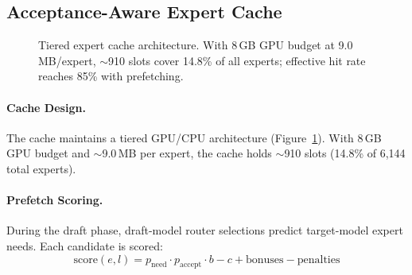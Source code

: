 \documentclass[letterpaper,twocolumn,10pt]{article}
\begin{document}
\subsection{Acceptance-Aware Expert Cache}\label{sec:cache}

\begin{figure}[t]
\centering
{}
\caption{Tiered expert cache architecture.  With 8\,GB GPU budget
  at 9.0\,MB/expert, ${\sim}$910 slots cover 14.8\% of all experts;
  effective hit rate reaches 85\% with prefetching.}\label{fig:cache}
\end{figure}

\paragraph{Cache Design.}  The cache maintains a tiered GPU/CPU
architecture (Figure~\ref{fig:cache}).  With 8\,GB GPU budget and
${\sim}$9.0\,MB per expert, the cache holds ${\sim}$910 slots (14.8\% of
6{,}144 total experts).

\paragraph{Prefetch Scoring.}  During the draft phase, draft-model router
selections predict target-model expert needs.  Each candidate is scored:
\begin{equation}
  \text{score}(e,l) = p_{\text{need}} \cdot p_{\text{accept}} \cdot b - c + \text{bonuses} - \text{penalties}
\end{equation}
\end{document}
